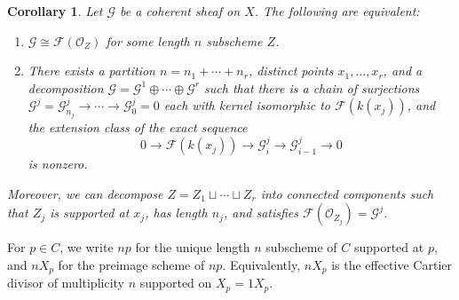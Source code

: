\documentclass{amsart}
\theoremstyle{plain}
\newtheorem{corollary}[theorem]{Corollary}
\theoremstyle{definition}
\theoremstyle{remark}
\begin{document}
    \begin{corollary}\label{ext1_checkhilb}
        Let $\mathcal G$ be a coherent sheaf on $X$.
        The following are equivalent:
        \begin{enumerate}
            \item $\mathcal G\cong\mathcal F(\mathcal O_Z)$ for some length $n$ subscheme $Z$.
            \item There exists a partition $n=n_1+\cdots+n_r$, distinct points $x_1,\ldots,x_r$, and a decomposition $\mathcal G=\mathcal G^1\oplus\cdots\oplus\mathcal G^r$ such that there is a chain of surjections $\mathcal G^j=\mathcal G^j_{n_j}\to\cdots\to\mathcal G^j_0=0$ each with kernel isomorphic to $\mathcal F(k(x_j))$, and the extension class of the exact sequence
            \[0\to \mathcal F(k(x_j))\to \mathcal G_i^j\to\mathcal G_{i-1}^j\to 0\]
            is nonzero.
        \end{enumerate}

        Moreover, we can decompose $Z=Z_1\sqcup\cdots\sqcup Z_r$ into connected components such that $Z_j$ is supported at $x_j$, has length $n_j$, and satisfies $\mathcal F(\mathcal O_{Z_j})=\mathcal G^j$.
    \end{corollary}
    For $p\in C$, we write $np$ for the unique length $n$ subscheme of $C$ supported at $p$, and $nX_p$ for the preimage scheme of $np$.
    Equivalently, $nX_p$ is the effective Cartier divisor of multiplicity $n$ supported on $X_p=1X_p$.
\end{document}
